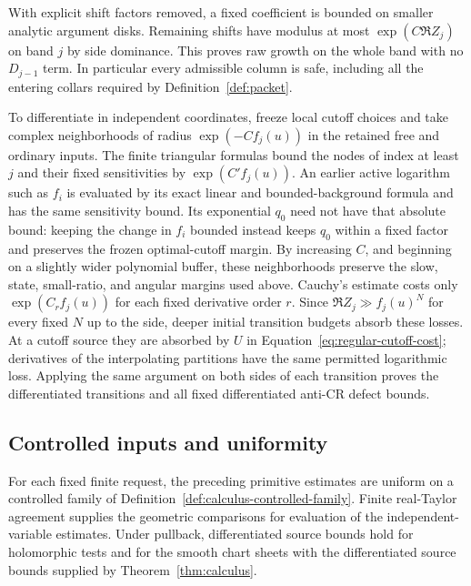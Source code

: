 With explicit shift factors removed, a fixed coefficient is bounded
on smaller analytic argument disks.  Remaining shifts have modulus
at most $\exp(C\Re Z_j)$ on band $j$ by side dominance.  This
proves raw growth on the whole band with no $D_{j-1}$ term.  In
particular every admissible column is safe, including all the
entering collars required by Definition~\ref{def:packet}.

To differentiate in independent coordinates, freeze local cutoff
choices and take complex neighborhoods of radius
$\exp(-C f_j(u))$ in the retained free and ordinary inputs.
The finite triangular formulas bound the nodes of index at least
$j$ and their fixed sensitivities by $\exp(C'f_j(u))$.
An earlier active logarithm such as $f_i$ is evaluated by its exact
linear and bounded-background formula and has the same sensitivity
bound.  Its exponential $q_0$ need not have that absolute bound:
keeping the change in $f_i$ bounded instead keeps $q_0$ within a
fixed factor and preserves the frozen optimal-cutoff margin.
By increasing $C$, and beginning on a slightly wider polynomial
buffer, these neighborhoods preserve the slow, state, small-ratio,
and angular margins used above.  Cauchy's estimate costs only
$\exp(C_r f_j(u))$ for each fixed derivative order $r$.
Since $\Re Z_j\gg f_j(u)^N$ for every fixed $N$ up to the side,
deeper initial transition budgets absorb these losses.  At a
cutoff source they are absorbed by $U$ in
Equation~\eqref{eq:regular-cutoff-cost}; derivatives of the interpolating
partitions have the same permitted logarithmic loss.  Applying
the same argument on both sides of each transition proves the
differentiated transitions and all fixed differentiated anti-CR
defect bounds.

\subsection{Controlled inputs and uniformity}

\begin{lemma}\label{lem:regular-controlled-inputs}
For each fixed finite request, the preceding primitive estimates are
uniform on a controlled family of
Definition~\ref{def:calculus-controlled-family}.  Finite real-Taylor
agreement supplies the geometric comparisons for evaluation of the
independent-variable estimates.  Under pullback, differentiated source
bounds hold for holomorphic tests and for the smooth chart sheets with
the differentiated source bounds supplied by
Theorem~\ref{thm:calculus}.
\end{lemma}

